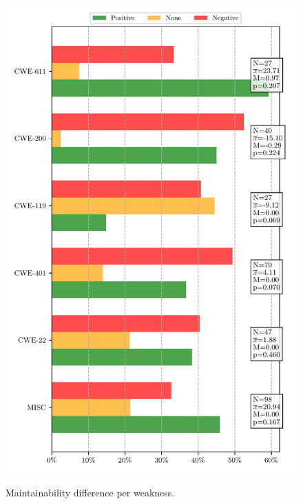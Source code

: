 \documentclass[10pt,conference]{IEEEtran}
\begin{document}
\begin{figure}[htp]
{	\includegraphics[scale=0.4]{figures/main_per_cwe_spec_664.pdf}}
	\vspace{-0.3cm}
    \caption{Maintainability difference per weakness.}
	\label{fig:pat}
	\vspace{-0.4cm}
\end{figure}
\end{document}
